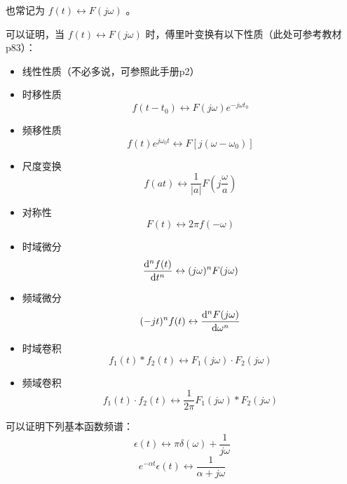 \documentclass[UTF8,a4paper,11pt]{article}
\begin{document}
也常记为 $f(t)\leftrightarrow F(j\omega)$ 。

可以证明，当 $f(t)\leftrightarrow F(j\omega)$ 时，傅里叶变换有以下性质（此处可参考教材p83）：
\begin{itemize}
\item 线性性质（不必多说，可参照此手册p2）
\item 时移性质
\begin{equation}
f(t-t_0)\leftrightarrow F(j\omega)e^{-j\omega t_0}
\end{equation}
\item 频移性质
\begin{equation}
f(t)e^{j\omega_0 t}\leftrightarrow F[j(\omega-\omega_0)]
\end{equation}
\item 尺度变换
\begin{equation}
f(at)\leftrightarrow \frac{1}{\left | a \right |}F(j\frac{\omega}{a})
\end{equation}
\item 对称性
\begin{equation}
F(t)\leftrightarrow 2\pi f(-\omega)
\end{equation}
\item 时域微分
\begin{equation}
\frac{{\rm d}^nf(t)}{{\rm d}t^n}\leftrightarrow (j\omega)^nF(j\omega)
\end{equation}
\item 频域微分
\begin{equation}
(-jt)^nf(t)\leftrightarrow \frac{{\rm d}^nF(j\omega)}{{\rm d}\omega^n}
\end{equation}
\item 时域卷积
\begin{equation}
f_1(t)*f_2(t)\leftrightarrow F_1(j\omega)\cdot F_2(j\omega)
\end{equation}
\item 频域卷积
\begin{equation}
f_1(t)\cdot f_2(t)\leftrightarrow \frac{1}{2\pi}F_1(j\omega)*F_2(j\omega)
\end{equation}
\end{itemize} 

可以证明下列基本函数频谱：
\begin{equation}
\epsilon(t)\leftrightarrow \pi\delta(\omega)+\frac{1}{j\omega}
\end{equation}
\begin{equation}
e^{-\alpha t}\epsilon(t)\leftrightarrow \frac{1}{\alpha+j\omega}
\end{equation}
\end{document}
